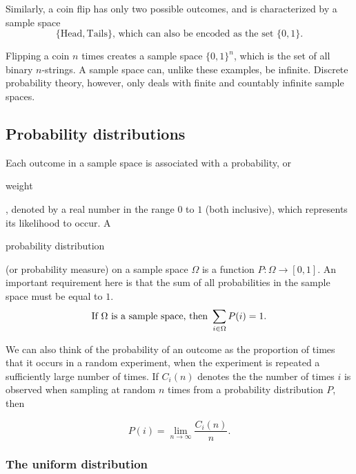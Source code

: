 \documentclass[11pt]{article}
\theoremstyle{plain}
\theoremstyle{definition}
\begin{document}
\noindent Similarly, a coin flip has only two possible outcomes, and is characterized by a sample space
\begin{displaymath}
  \{ \text{Head}, \text{Tails} \} \text{, which can also be encoded as the set } \{ 0, 1 \}.
\end{displaymath}

\noindent Flipping a coin $ n $ times creates a sample space $ \{0, 1\}^n $,
which is the set of all binary $ n $-strings. A sample space can, unlike these
examples, be infinite. Discrete probability theory, however, only deals with 
finite and countably infinite sample spaces.

\subsection*{Probability distributions}

Each outcome in a sample space is associated with a probability, or
\begin{em}weight\end{em}, denoted by a real number in the range $0$ to $1$ (both
  inclusive), which represents its likelihood to occur. A \begin{em}probability distribution\end{em} (or probability measure) on a sample space $\Omega$ is a function $P : \Omega \rightarrow [0, 1]$. An important requirement here is that the sum of all probabilities in the sample space must be equal to $ 1 $.
\begin{displaymath}
  \text{If $ \Omega $ is a sample space, then } \sum_{i \in \Omega} P(i) = 1.
\end{displaymath}

\noindent We can also think of the probability of an outcome as the proportion
of times that it occurs in a random experiment, when the experiment is repeated
a sufficiently large number of times. If $ C_i(n) $ denotes the the number of
times $ i $ is observed when sampling at random $ n $ times from a probability 
distribution $ P $, then

\begin{displaymath}
  \displaystyle P(i) = \lim_{n\to \infty} \frac{C_i(n)}{n} .
\end{displaymath}

\subsubsection*{The uniform distribution}
\end{document}
